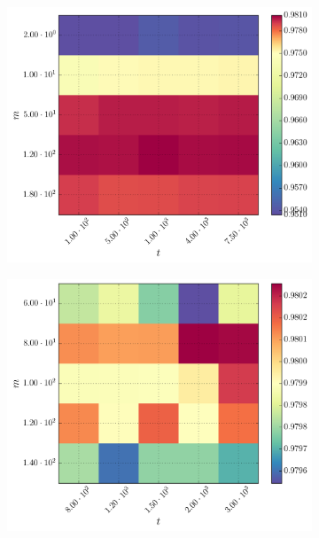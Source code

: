 \begin{figure}[h]
	\centering
	\begin{subfigure}[t]{0.49\textwidth}
		\centering
		\includegraphics[width=\textwidth]{figures/gridsearch/rf/superclasses/rf-superclasses-01.png}				
	\end{subfigure}
	\begin{subfigure}[t]{0.49\textwidth}
		\centering
		\includegraphics[width=\textwidth]{figures/gridsearch/rf/superclasses/rf-superclasses-02.png}		
	\end{subfigure}

\end{figure}
